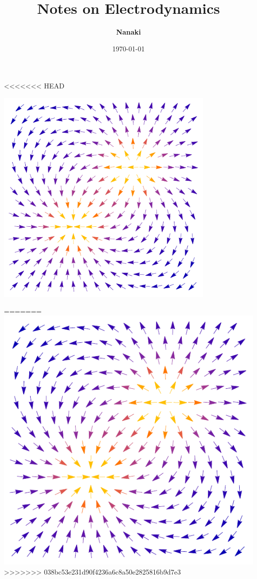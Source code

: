 \documentclass[
    ebook,
    11pt,
    twoside,
    onecolumn,
    openright,
    final
]{memoir}
\begin{document}
\begin{titlingpage}
    \title{\HUGE\textbf{Notes on Electrodynamics}}
    \author{\Large\textbf{Nanaki}}
    \date{\Large{\today}}

    \maketitle
<<<<<<< HEAD
    \begin{center}
        \includegraphics[width=0.8\textwidth]{figures/cover.pdf}
    \end{center}
=======
    \includegraphics{figures/cover.pdf}
>>>>>>> 038bc53e231d90f4236a6c8a50e2825816b9d7e3
\end{titlingpage}
\end{document}
